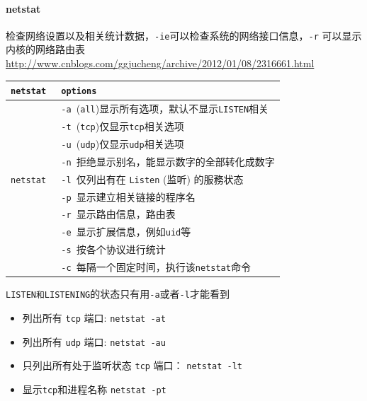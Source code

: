 \documentclass[UTF8,a4paper,12pt]{ctexbook}
\begin{document}
			\paragraph{netstat} 检查网络设置以及相关统计数据，\verb|-ie|可以检查系统的网络接口信息，\verb|-r| 可以显示内核的网络路由表
				\url{http://www.cnblogs.com/ggjucheng/archive/2012/01/08/2316661.html}
				
				\begin{table}[H]
					\centering
					\begin{tabular}{l|m{12cm}}
						\hline
						\verb|netstat |   	   & \verb|options| \\
						\hline
						\verb| |   	   & \verb|-a |(\verb|all|)显示所有选项，默认不显示\verb|LISTEN|相关 \\
						\verb| |   	   & \verb|-t |(\verb|tcp|)仅显示\verb|tcp|相关选项\\
						\verb| |   	   & \verb|-u |(\verb|udp|)仅显示\verb|udp|相关选项 \\
						\verb| |   	   & \verb|-n |拒绝显示别名，能显示数字的全部转化成数字 \\
						\verb|netstat |   	   & \verb|-l |仅列出有在 \verb|Listen| (监听) 的服務状态\\
						\verb| |   	   & \verb|-p |显示建立相关链接的程序名 \\
						\verb| |   	   & \verb|-r |显示路由信息，路由表 \\
						\verb| |   	   & \verb|-e |显示扩展信息，例如\verb|uid|等\\
						\verb| |   	   & \verb|-s |按各个协议进行统计 \\
						\verb| |   	   & \verb|-c |每隔一个固定时间，执行该\verb|netstat|命令\\
						\hline
					\end{tabular}
				\end{table}	
					
				\verb|LISTEN和LISTENING|的状态只有用\verb|-a|或者\verb|-l|才能看到
				
				\begin{itemize}[itemindent = 1em]
					\item 列出所有 \verb|tcp| 端口: \verb|netstat -at|
					\item 列出所有 \verb|udp| 端口: \verb|netstat -au|
					\item 只列出所有处于监听状态 \verb|tcp| 端口： \verb|netstat -lt|
					\item 显示\verb|tcp|和进程名称 \verb|netstat -pt|
				\end{itemize}
				
\end{document}
